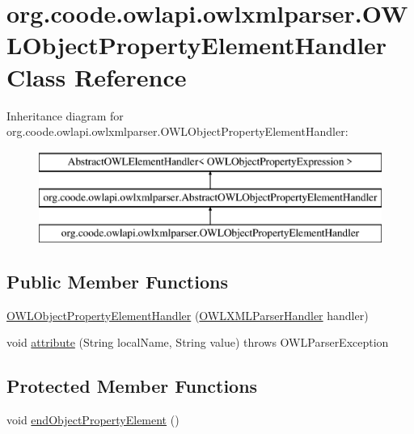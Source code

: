 \hypertarget{classorg_1_1coode_1_1owlapi_1_1owlxmlparser_1_1_o_w_l_object_property_element_handler}{\section{org.\-coode.\-owlapi.\-owlxmlparser.\-O\-W\-L\-Object\-Property\-Element\-Handler Class Reference}
\label{classorg_1_1coode_1_1owlapi_1_1owlxmlparser_1_1_o_w_l_object_property_element_handler}
}
Inheritance diagram for org.\-coode.\-owlapi.\-owlxmlparser.\-O\-W\-L\-Object\-Property\-Element\-Handler\-:\begin{figure}[H]
\begin{center}
\leavevmode
\includegraphics[height=3.000000cm]{classorg_1_1coode_1_1owlapi_1_1owlxmlparser_1_1_o_w_l_object_property_element_handler}
\end{center}
\end{figure}
\subsection*{Public Member Functions}
\begin{DoxyCompactItemize}
\item 
\hyperlink{classorg_1_1coode_1_1owlapi_1_1owlxmlparser_1_1_o_w_l_object_property_element_handler_a3c3c97467b6a5841149ec93bcbd58e7c}{O\-W\-L\-Object\-Property\-Element\-Handler} (\hyperlink{classorg_1_1coode_1_1owlapi_1_1owlxmlparser_1_1_o_w_l_x_m_l_parser_handler}{O\-W\-L\-X\-M\-L\-Parser\-Handler} handler)
\item 
void \hyperlink{classorg_1_1coode_1_1owlapi_1_1owlxmlparser_1_1_o_w_l_object_property_element_handler_a2aa864ca7b9c921be06c806836ae087b}{attribute} (String local\-Name, String value)  throws O\-W\-L\-Parser\-Exception 
\end{DoxyCompactItemize}
\subsection*{Protected Member Functions}
\begin{DoxyCompactItemize}
\item 
void \hyperlink{classorg_1_1coode_1_1owlapi_1_1owlxmlparser_1_1_o_w_l_object_property_element_handler_a8320ba49c7f32b8d562577103290ec97}{end\-Object\-Property\-Element} ()
\end{DoxyCompactItemize}
